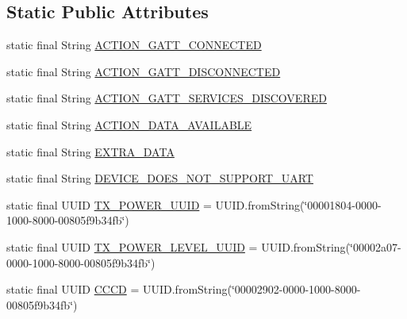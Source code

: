 \subsection*{Static Public Attributes}
\begin{DoxyCompactItemize}
\item 
static final String \hyperlink{classcom_1_1mdex_1_1venus_alpha01a_1_1_uart_service_ac6fc749e56339e8b9d60f35733ccb3b2}{A\+C\+T\+I\+O\+N\+\_\+\+G\+A\+T\+T\+\_\+\+C\+O\+N\+N\+E\+C\+T\+ED}
\item 
static final String \hyperlink{classcom_1_1mdex_1_1venus_alpha01a_1_1_uart_service_a27877d823f3ebe78f54d5d7cd3dd75c8}{A\+C\+T\+I\+O\+N\+\_\+\+G\+A\+T\+T\+\_\+\+D\+I\+S\+C\+O\+N\+N\+E\+C\+T\+ED}
\item 
static final String \hyperlink{classcom_1_1mdex_1_1venus_alpha01a_1_1_uart_service_a81f26c05476d44bdbb3e90d18bd5fccc}{A\+C\+T\+I\+O\+N\+\_\+\+G\+A\+T\+T\+\_\+\+S\+E\+R\+V\+I\+C\+E\+S\+\_\+\+D\+I\+S\+C\+O\+V\+E\+R\+ED}
\item 
static final String \hyperlink{classcom_1_1mdex_1_1venus_alpha01a_1_1_uart_service_a23780e50bdd9a59daa0647fffdc457fc}{A\+C\+T\+I\+O\+N\+\_\+\+D\+A\+T\+A\+\_\+\+A\+V\+A\+I\+L\+A\+B\+LE}
\item 
static final String \hyperlink{classcom_1_1mdex_1_1venus_alpha01a_1_1_uart_service_a893d04451b771197abc5d99971933d9d}{E\+X\+T\+R\+A\+\_\+\+D\+A\+TA}
\item 
static final String \hyperlink{classcom_1_1mdex_1_1venus_alpha01a_1_1_uart_service_a42a3ccdf849fdea2a227f4bfe6fbf06f}{D\+E\+V\+I\+C\+E\+\_\+\+D\+O\+E\+S\+\_\+\+N\+O\+T\+\_\+\+S\+U\+P\+P\+O\+R\+T\+\_\+\+U\+A\+RT}
\item 
static final U\+U\+ID \hyperlink{classcom_1_1mdex_1_1venus_alpha01a_1_1_uart_service_a81732b1493c849122f7390b4ceb42180}{T\+X\+\_\+\+P\+O\+W\+E\+R\+\_\+\+U\+U\+ID} = U\+U\+I\+D.\+from\+String(\char`\"{}00001804-\/0000-\/1000-\/8000-\/00805f9b34fb\char`\"{})
\item 
static final U\+U\+ID \hyperlink{classcom_1_1mdex_1_1venus_alpha01a_1_1_uart_service_a553fcb4c8cb6523b461f9f3e57b0bcb1}{T\+X\+\_\+\+P\+O\+W\+E\+R\+\_\+\+L\+E\+V\+E\+L\+\_\+\+U\+U\+ID} = U\+U\+I\+D.\+from\+String(\char`\"{}00002a07-\/0000-\/1000-\/8000-\/00805f9b34fb\char`\"{})
\item 
static final U\+U\+ID \hyperlink{classcom_1_1mdex_1_1venus_alpha01a_1_1_uart_service_a30186c5d6a56d7f5e8a159a003187126}{C\+C\+CD} = U\+U\+I\+D.\+from\+String(\char`\"{}00002902-\/0000-\/1000-\/8000-\/00805f9b34fb\char`\"{})
\item 

\end{DoxyCompactItemize}
